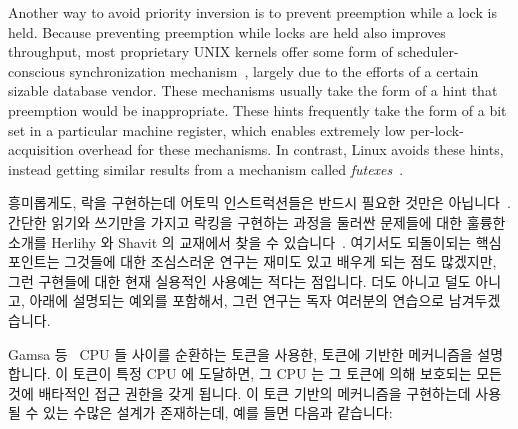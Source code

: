 Another way to avoid priority inversion is to prevent preemption
while a lock is held.
Because preventing preemption while locks are held also improves throughput,
most proprietary UNIX kernels offer some form of scheduler-conscious
synchronization mechanism~\cite{Kontothanassis97a},
largely due to the efforts of a certain sizable database vendor.
These mechanisms usually take the form of a hint that preemption
would be inappropriate.
These hints frequently take the form of a bit set in a particular
machine register, which enables extremely low per-lock-acquisition overhead
for these mechanisms.
In contrast, Linux avoids these hints, instead getting
similar results from a mechanism called
\emph{futexes}~\cite{HubertusFrancke2002Futex,IngoMolnar2006RobustFutexes,StevenRostedt2006piFutexes,UlrichDrepper2011Futexes}.
\fi

흥미롭게도, 락을 구현하는데 어토믹 인스트럭션들은 반드시 필요한 것만은
아닙니다~\cite{Dijkstra65a,Lamport74a}.
간단한 읽기와 쓰기만을 가지고 락킹을 구현하는 과정을 둘러싼 문제들에 대한
훌륭한 소개를 Herlihy 와 Shavit 의 교재에서 찾을 수
있습니다~\cite{HerlihyShavit2008Textbook}.
여기서도 되돌이되는 핵심 포인트는 그것들에 대한 조심스러운 연구는 재미도 있고
배우게 되는 점도 많겠지만, 그런 구현들에 대한 현재 실용적인 사용예는 적다는
점입니다.
더도 아니고 덜도 아니고, 아래에 설명되는 예외를 포함해서, 그런 연구는 독자
여러분의 연습으로 남겨두겠습니다.

Gamsa 등~\cite[Section 5.3]{Gamsa99} CPU 들 사이를 순환하는 토큰을 사용한,
토큰에 기반한 메커니즘을 설명합니다.
이 토큰이 특정 CPU 에 도달하면, 그 CPU 는 그 토큰에 의해 보호되는 모든 것에
배타적인 접근 권한을 갖게 됩니다.
이 토큰 기반의 메커니즘을 구현하는데 사용될 수 있는 수많은 설계가 존재하는데,
예를 들면 다음과 같습니다:


